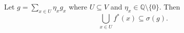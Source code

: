 Let $g = \sum_{x \in U} \eta_x g_x$ where $U \subseteq V$ and $\eta_x \in \mathbb{Q} \setminus \{0\}$. Then
$$\bigcup_{x \in U} f^*(x) \subseteq \sigma(g).$$
